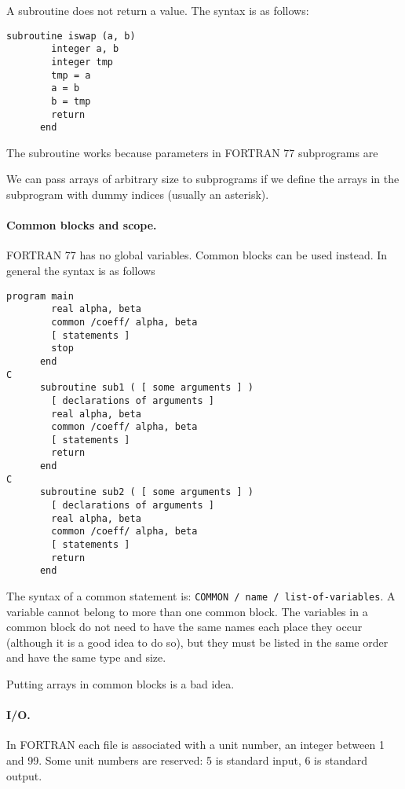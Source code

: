 A subroutine does not return a value. The syntax is as follows:
\begin{lstlisting}[language={[77]fortran}, style=snippet]
      subroutine iswap (a, b)
        integer a, b
        integer tmp
        tmp = a
        a = b
        b = tmp
        return
      end
\end{lstlisting}
The subroutine works because parameters in FORTRAN 77 subprograms are 

We can pass arrays of arbitrary size to subprograms if we define the arrays in the subprogram with dummy indices (usually an asterisk).

\paragraph{Common blocks and scope.}
FORTRAN 77 has no global variables. Common blocks can be used instead. In general the syntax is as follows
\begin{lstlisting}[language={[77]fortran}, style=snippet]
      program main
        real alpha, beta
        common /coeff/ alpha, beta
        [ statements ]
        stop
      end
C
      subroutine sub1 ( [ some arguments ] )
        [ declarations of arguments ]
        real alpha, beta
        common /coeff/ alpha, beta
        [ statements ]
        return
      end
C
      subroutine sub2 ( [ some arguments ] )
        [ declarations of arguments ]
        real alpha, beta
        common /coeff/ alpha, beta
        [ statements ]
        return
      end
\end{lstlisting}
The syntax of a common statement is: \texttt{COMMON / name / list-of-variables}. A variable cannot belong to more than one common block. The variables in a common block do not need to have the same names each place they occur (although it is a good idea to do so), but they must be listed in the same order and have the same type and size.

Putting arrays in common blocks is a bad idea.
\paragraph{I/O.} In FORTRAN each file is associated with a unit number, an integer between 1 and 99. Some unit numbers are reserved: 5 is standard input, 6 is standard output. 

